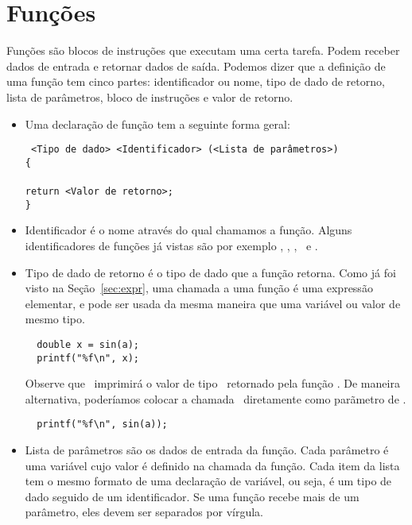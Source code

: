 
\chapter{Funções}

Funções são blocos de instruções que executam uma certa tarefa. 
Podem receber dados de entrada e retornar dados de saída. 
Podemos dizer que a definição de uma função tem cinco partes: identificador ou nome, tipo de dado de retorno, lista de parâmetros, bloco de instruções e valor de retorno.

\begin{itemize}

\item Uma declaração de função tem a seguinte forma geral:

{\tt
<Tipo de dado> <Identificador> (<Lista de parâmetros>)\\
\{\\
\\
\TAB return <Valor de retorno>;\\
\}\\
}

\item Identificador é o nome através do qual chamamos a função. Alguns identificadores de funções já vistas são por exemplo \PRINTF, \SCANF, \FGETS, \SIN\ e \COS.

\item Tipo de dado de retorno é o tipo de dado que a função retorna. Como já foi visto na Seção~\ref{sec:expr}, uma chamada a uma função é uma expressão elementar, e pode ser usada da mesma maneira que uma variável ou valor de mesmo tipo.

\begin{lstlisting}
  double x = sin(a);
  printf("%f\n", x);
\end{lstlisting}

  Observe que \PRINTF\ imprimirá o valor de tipo \DOUBLE\ retornado pela função \SIN. De maneira alternativa, poderíamos colocar a chamada \SIN\ diretamente como parãmetro de \PRINTF.

\begin{lstlisting}
  printf("%f\n", sin(a));
\end{lstlisting}

\item Lista de parâmetros são os dados de entrada da função. Cada parâmetro é uma variável cujo valor é definido na chamada da função. Cada item da lista tem o mesmo formato de uma declaração de variável, ou seja, é um tipo de dado seguido de um identificador. Se uma função recebe mais de um parâmetro, eles devem ser separados por vírgula.


\end{itemize}
